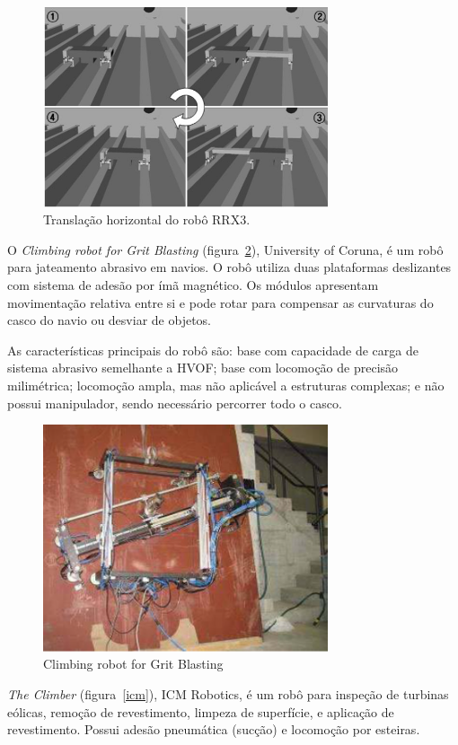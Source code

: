 \begin{figure}[ht]
\centering
\includegraphics[width=8.4cm]{sota/figs/climbers/RRX3_moving.jpg}
\caption{Translação horizontal do robô RRX3.}
\label{rrx3}
\end{figure}

O \emph{Climbing robot for Grit Blasting} (figura~\ref{grit}), University of
Coruna, é um robô para jateamento abrasivo em navios. O robô utiliza duas plataformas deslizantes com sistema de adesão por
ímã magnético. Os módulos apresentam movimentação relativa entre si e pode rotar
para compensar as curvaturas do casco do navio ou desviar de objetos. 

As características principais do robô são: base com
capacidade de carga de sistema abrasivo semelhante a HVOF; base com
locomoção de precisão milimétrica; locomoção ampla, mas não aplicável a
estruturas complexas; e não possui manipulador, sendo necessário percorrer todo
o casco.

\begin{figure}[ht]
\centering
\includegraphics[width=8.4cm]{sota/figs/climbers/grit.png}
\caption{Climbing robot for Grit Blasting}
\label{grit}
\end{figure}

\emph{The Climber} (figura~\ref{icm}), ICM Robotics, é um robô para inspeção de
turbinas eólicas, remoção de revestimento, limpeza de superfície, e aplicação de revestimento.
Possui adesão pneumática (sucção) e locomoção por esteiras. 

